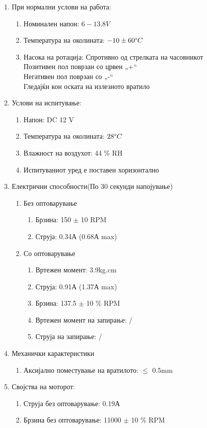\documentclass[12pt]{article}
\begin{document}
		\renewcommand{\theenumii}{\arabic{enumii}}
    \renewcommand{\theenumiii}{\arabic{enumiii}}
	  \begin{enumerate}
		  \item При нормални услови на работа:
			  \begin{enumerate}
					\item Номинален напон: $ 6-13.8 V $
					\item Температура на околината: $ -10 \pm 60 \degree C $
					\item Насока на ротација: Спротивно од стрелката на часовникот\\Позитивен пол поврзан со црвен „+“\\Негативен пол поврзан со „-“\\Гледајќи кон оската на излезното вратило
					\end{enumerate}
		  \item Услови на испитување:
				\begin{enumerate}
					\item Напон: DC 12 V
					\item Температура на околината: $ 28 \degree C $
					\item Влажност на воздухот: 44 \% RH
					\item Испитуваниот уред е поставен хоризонтално
					\end{enumerate}
	  	\item Електрични способности(По 30 секунди напојување)
				\begin{enumerate}
				  \item Без оптоварување
					  \begin{enumerate}
						  \item Брзина: 150 $\pm$ 10 RPM
						  \item Струја: 0.34А (0.68А max)
						  \end{enumerate}
				  \item Со оптоварување
					  \begin{enumerate}
						  \item Вртежен момент: 3.9kg.cm
						  \item Струја: 0.91А (1.37А max)
						  \item Брзина: 137.5 $\pm$ 10 \% RPM
						  \item Вртежен момент на запирање: /
						  \item Струја на запирање: /
						  \end{enumerate}
	        \end{enumerate}
	    \item Механички карактеристики
			  \begin{enumerate}
				  \item Аксијално поместување на вратилото: $\leq$ 0.5mm
				  \end{enumerate}
	    \item Својства на моторот:
			  \begin{enumerate}
				  \item Струја без оптоварување: 0.19А
				  \item Брзина без оптоварување: 11000 $\pm$ 10 \% RPM
				  \end{enumerate}
		  \end{enumerate}
\end{document}
